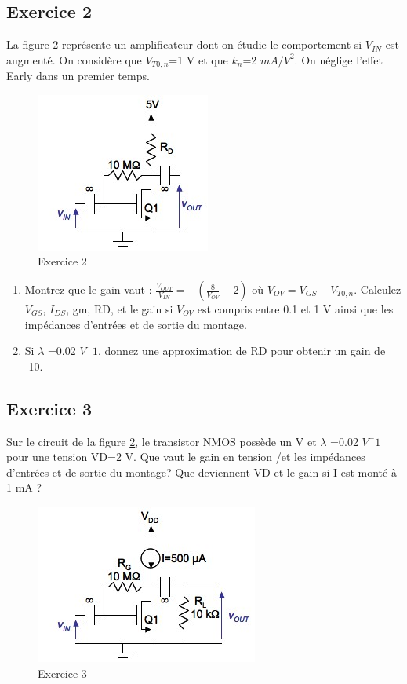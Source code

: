 \documentclass[paper=a4, fontsize=11pt]{article} %
\numberwithin{equation}{section} %
\numberwithin{figure}{section} %
\numberwithin{table}{section} %
\begin{document}
\subsection*{Exercice 2}
La figure 2 représente un amplificateur dont on étudie le comportement si $V_{IN}$ est augmenté. On considère que $V_{T0,n}$=1 V et que $k_n$=2 $mA/V^2$. On néglige l'effet Early dans un premier temps.
\begin{figure}[!htbp]
   \centering
   \includegraphics[]{figure/fig2-2.png}
   \caption{Exercice 2}
   \label{fig2-2}
\end{figure}
\begin{enumerate}
\item Montrez que le gain vaut : $\frac{V_{OUT}}{V_{IN}} = -\left(\frac{8}{V_{OV}}-2\right)$
où $V_{OV}=V_{GS}-V_{T0,n}$. Calculez $V_{GS}$, $I_{DS}$, gm, RD, et le gain si $V_{OV}$ est
compris entre 0.1 et 1 V ainsi que les impédances d'entrées et de sortie du montage.
\item Si $\lambda$ =0.02 $V{^-1}$, donnez une approximation de RD pour obtenir un gain de -10.
\end{enumerate}
\subsection*{Exercice 3}
Sur le circuit de la figure \ref{fig2-3}, le transistor NMOS possède un  V et $\lambda$ =0.02 $V^-1$ pour une tension VD=2 V. Que vaut le gain en tension \vout/\vin et les impédances d'entrées et de sortie du montage? Que deviennent VD et le gain si I est monté à 1 mA ?
\begin{figure}[!htbp]
   \centering
   \includegraphics[]{figure/fig2-3.png}
   \caption{Exercice 3}
   \label{fig2-3}
\end{figure}
\end{document}
